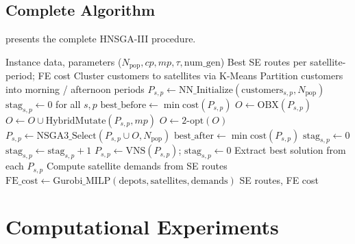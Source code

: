 \documentclass[11pt, a4paper]{article}
\numberwithin{equation}{section}
\begin{document}
\subsection{Complete Algorithm}

 presents the complete HNSGA-III procedure.

\begin{algorithm}[ht]
\caption{HNSGA-III for 2E-MD-MD-MP-CVRP-SPD}
\label{alg:hnsga3}
\begin{algorithmic}[1]
\Require Instance data, parameters ($N_{\mathrm{pop}},cp,mp,\tau,
         \mathrm{num\_gen}$)
\Ensure Best SE routes per satellite-period; FE cost
\State Cluster customers to satellites via K-Means
\State Partition customers into morning / afternoon periods
  \State $P_{s,p} \leftarrow \mathrm{NN\_Initialize}(\mathrm{customers}_{s,p},
         N_{\mathrm{pop}})$
         \quad{}
\EndFor
\State $\mathrm{stag}_{s,p} \leftarrow 0$ for all $s,p$
    \State $\mathrm{best\_before} \leftarrow \min\mathrm{cost}(P_{s,p})$
      \State $O \leftarrow \mathrm{OBX}(P_{s,p})$
    \EndIf
    \State $O \leftarrow O \cup \mathrm{HybridMutate}(P_{s,p},mp)$
    \State $O \leftarrow \mathrm{2\text{-}opt}(O)$
    \State $P_{s,p} \leftarrow \mathrm{NSGA3\_Select}(P_{s,p}\cup O,
           N_{\mathrm{pop}})$
    \State $\mathrm{best\_after} \leftarrow \min\mathrm{cost}(P_{s,p})$
      \State $\mathrm{stag}_{s,p} \leftarrow 0$
    \Else
      \State $\mathrm{stag}_{s,p} \leftarrow \mathrm{stag}_{s,p}+1$
    \EndIf
      \State $P_{s,p} \leftarrow \mathrm{VNS}(P_{s,p})$;\quad
             $\mathrm{stag}_{s,p} \leftarrow 0$
    \EndIf
  \EndFor
\EndFor
\State Extract best solution from each $P_{s,p}$
\State Compute satellite demands from SE routes
\State $\mathrm{FE\_cost} \leftarrow
       \mathrm{Gurobi\_MILP}(\mathrm{depots},\mathrm{satellites},
       \mathrm{demands})$
\State \Return SE routes, FE cost
\end{algorithmic}
\end{algorithm}

\section{Computational Experiments}
\label{sec:exp}
\end{document}
